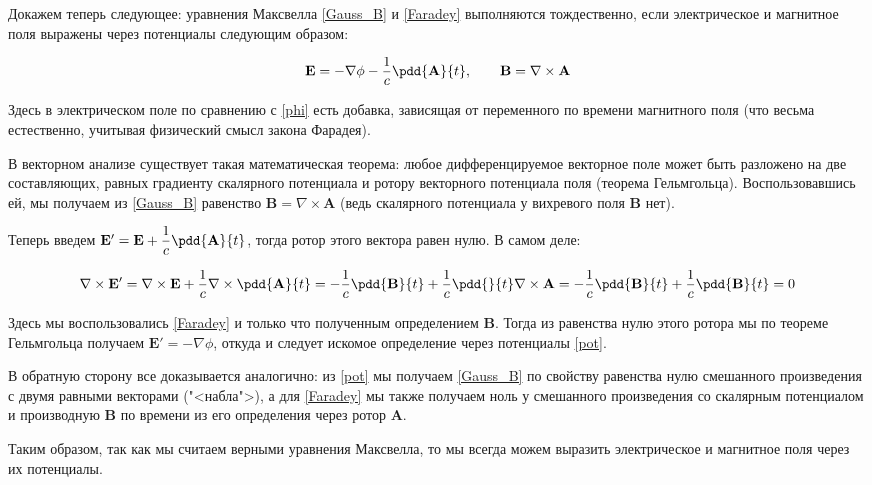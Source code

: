 \documentclass[12pt]{kiarticle}
\begin{document}
Докажем теперь следующее: уравнения Максвелла \eqref{Gauss_B} и \eqref{Faradey} выполняются тождественно, если электрическое и магнитное поля выражены через потенциалы следующим образом:

\begin{equation}\label{pot}
\mathbf{E} = - \nabla \phi  - \dfrac{1}{c} \pdd{\mathbf{A}}{t}, \qquad \mathbf{B} = \nabla \times \mathbf{A}
\end{equation}

Здесь в электрическом поле по сравнению с \eqref{phi} есть добавка, зависящая от переменного по времени магнитного поля (что весьма естественно, учитывая физический смысл закона Фарадея).

В векторном анализе существует такая математическая теорема: любое дифференцируемое векторное поле может быть разложено на две составляющих, равных градиенту скалярного потенциала и ротору векторного потенциала поля (теорема Гельмгольца). Воспользовавшись ей, мы получаем из \eqref{Gauss_B} равенство $ \mathbf{B} = \nabla \times \mathbf{A} $ (ведь скалярного потенциала у вихревого поля $ \mathbf{B} $ нет). 

Теперь введем $ \mathbf{E}' = \mathbf{E} + \dfrac{1}{c} \pdd{\mathbf{A}}{t} $, тогда ротор этого вектора равен нулю. В самом деле:

\begin{equation}\label{}
\nabla \times \mathbf{E}' = \nabla \times \mathbf{E} + \dfrac{1}{c}\nabla \times \pdd{\mathbf{A}}{t} = -\dfrac{1}{c} \pdd{\mathbf{B}}{t} +   \dfrac{1}{c}\pdd{}{t} \nabla \times \mathbf{A} =  -\dfrac{1}{c} \pdd{\mathbf{B}}{t} + \dfrac{1}{c} \pdd{\mathbf{B}}{t} = 0
\end{equation}

Здесь мы воспользовались \eqref{Faradey} и только что полученным определением $ \mathbf{B} $. Тогда из равенства нулю этого ротора мы по теореме Гельмгольца получаем $ \mathbf{E}' = - \nabla \phi $, откуда и следует искомое определение через потенциалы \eqref{pot}.

В обратную сторону все доказывается аналогично: из \eqref{pot} мы получаем \eqref{Gauss_B} по свойству равенства нулю смешанного произведения с двумя равными векторами ("<набла">), а для  \eqref{Faradey} мы также получаем ноль у смешанного произведения со скалярным потенциалом и производную $ \mathbf{B} $ по времени из его определения через ротор $ \mathbf{A} $.

Таким образом, так как мы считаем верными уравнения Максвелла, то мы всегда можем выразить электрическое и магнитное поля через их потенциалы.
\end{document}
